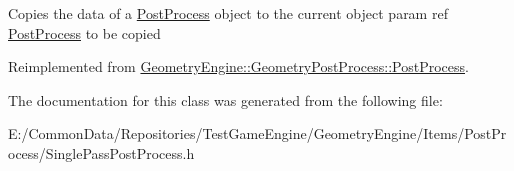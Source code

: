 Copies the data of a \mbox{\hyperlink{class_geometry_engine_1_1_geometry_post_process_1_1_post_process}{Post\+Process}} object to the current object param ref \mbox{\hyperlink{class_geometry_engine_1_1_geometry_post_process_1_1_post_process}{Post\+Process}} to be copied 

Reimplemented from \mbox{\hyperlink{class_geometry_engine_1_1_geometry_post_process_1_1_post_process_aba093c175b228894204e785a5a54e6e9}{Geometry\+Engine\+::\+Geometry\+Post\+Process\+::\+Post\+Process}}.



The documentation for this class was generated from the following file\+:\begin{DoxyCompactItemize}
\item 
E\+:/\+Common\+Data/\+Repositories/\+Test\+Game\+Engine/\+Geometry\+Engine/\+Items/\+Post\+Process/Single\+Pass\+Post\+Process.\+h\end{DoxyCompactItemize}
